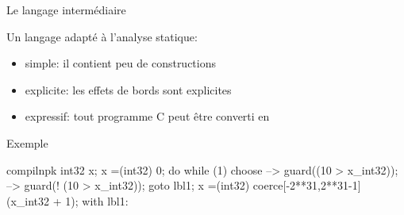 \begin{frame}{Le langage intermédiaire \newspeak}

Un langage adapté à l'analyse statique:

\begin{itemize}
\item simple: il contient peu de constructions
\item explicite: les effets de bords sont explicites
\item expressif: tout programme C peut être converti en \newspeak
\end{itemize}

\end{frame}

\begin{frame}[fragile]{Exemple}

\begin{SaveVerbatim}{compilnpk}
int32 x;
x =(int32) 0;
do {
    while (1) {
        choose {
            -->
                guard((10 > x_int32));
            -->
                guard(! (10 > x_int32));
                goto lbl1;
        }
        x =(int32) coerce[-2**31,2**31-1]
                        (x_int32 + 1);
    }
} with lbl1: {
}
\end{SaveVerbatim}

{\footnotesize
\begin{minipage}{0.3\linewidth}
\end{minipage}
\vrule\hspace{2pt}
\begin{minipage}{0.6\linewidth}
\end{minipage}
}

\end{frame}
